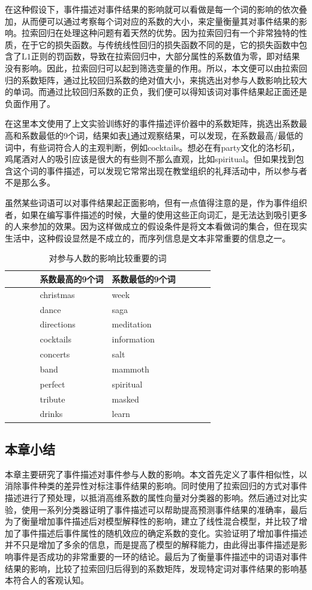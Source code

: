 在这种假设下，事件描述对事件结果的影响就可以看做是每一个词的影响的依次叠加，从而便可以通过考察每个词对应的系数的大小，来定量衡量其对事件结果的影响。拉索回归在处理这种问题有着天然的优势。因为拉索回归有一个非常独特的性质，在于它的损失函数。与传统线性回归的损失函数不同的是，它的损失函数中包含了$\mathrm{L1}$正则的罚函数，导致在拉索回归中，大部分属性的系数值为零，即对结果没有影响。因此，拉索回归可以起到筛选变量的作用。所以，本文便可以由拉索回归的系数矩阵，通过比较回归系数的绝对值大小，来挑选出对参与人数影响比较大的单词。而通过比较回归系数的正负，我们便可以得知该词对事件结果起正面还是负面作用了。

在这里本文使用了上文实验训练好的事件描述评价器中的系数矩阵，挑选出系数最高和系数最低的9个词，结果如表\ref{t1-2}通过观察结果，可以发现，在系数最高/最低的词中，有些词符合人的主观判断，例如cocktails。想必在有party文化的洛杉矶，鸡尾酒对人的吸引应该是很大的有些则不那么直观，比如spiritual。但如果找到包含这个词的事件描述，可以发现它常常出现在教堂组织的礼拜活动中，所以参与者不是那么多。

虽然某些词语可以对事件结果起正面影响，但有一点值得注意的是，作为事件组织者，如果在编写事件描述的时候，大量的使用这些正向词汇，是无法达到吸引更多的人来参加的效果。因为这样做成立的假设条件是将文本看做词的集合，但在现实生活中，这种假设显然是不成立的，而序列信息是文本非常重要的信息之一。

\begin{table}[htbp]
  \caption{\label{t1-2}对参与人数的影响比较重要的词}
    \centering
      \begin{tabular*}{\linewidth}{p{0.15\linewidth}p{0.35\linewidth}p{0.35\linewidth}p{0.15\linewidth}}
  \toprule      
      &系数最高的9个词 & 系数最低的9个词&\tabularnewline
  \midrule
  &christmas & week&\tabularnewline
  &dance & saga&\tabularnewline
  &directions & meditation&\tabularnewline
  &cocktails & information&\tabularnewline
  &concerts & salt&\tabularnewline
  &band & mammoth&\tabularnewline
  &perfect & spiritual&\tabularnewline
  &tribute & masked&\tabularnewline
  &drinks & learn&\tabularnewline
  \bottomrule
      \end{tabular*}
  \end{table}

\subsection{本章小结}
本章主要研究了事件描述对事件参与人数的影响。本文首先定义了事件相似性，以消除事件种类的差异性对标注事件结果的影响。同时使用了拉索回归的方式对事件描述进行了预处理，以抵消高维系数的属性向量对分类器的影响。然后通过对比实验，使用一系列分类器证明了事件描述可以帮助提高预测事件结果的准确率，最后为了衡量增加事件描述后对模型解释性的影响，建立了线性混合模型，并比较了增加了事件描述后事件属性的随机效应的确定系数的变化。实验证明了增加事件描述并不只是增加了多余的信息，而是提高了模型的解释能力，由此得出事件描述是影响事件是否成功的非常重要的一环的结论。最后为了衡量事件描述中的词语对事件结果的影响，比较了拉索回归后得到的系数矩阵，发现特定词对事件结果的影响基本符合人的客观认知。


